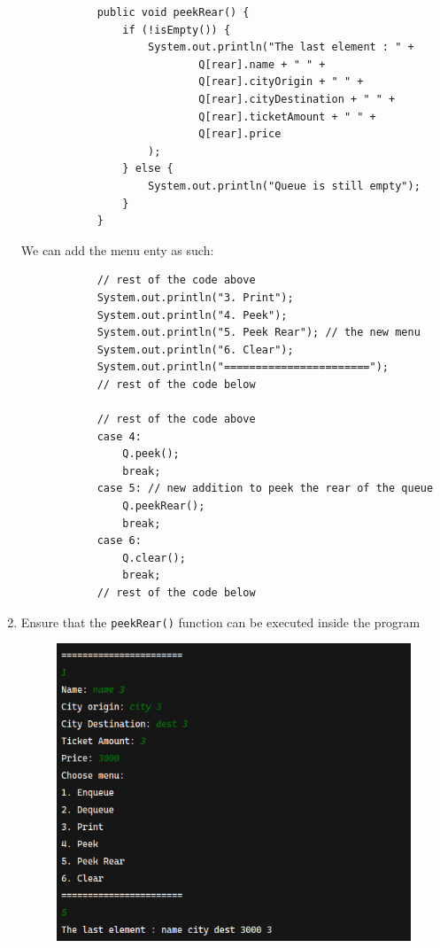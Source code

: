 \documentclass[12pt,titlepage]{article}
\begin{document}
\begin{enumerate}
{        \begin{verbatim}
            public void peekRear() {
                if (!isEmpty()) {
                    System.out.println("The last element : " +
                            Q[rear].name + " " +
                            Q[rear].cityOrigin + " " +
                            Q[rear].cityDestination + " " +
                            Q[rear].ticketAmount + " " +
                            Q[rear].price
                    );
                } else {
                    System.out.println("Queue is still empty");
                }
            }
        \end{verbatim}

        We can add the menu enty as such:
        
        \begin{verbatim}
            // rest of the code above
            System.out.println("3. Print");
            System.out.println("4. Peek");
            System.out.println("5. Peek Rear"); // the new menu
            System.out.println("6. Clear");
            System.out.println("=======================");
            // rest of the code below

            // rest of the code above
            case 4:
                Q.peek();
                break;
            case 5: // new addition to peek the rear of the queue
                Q.peekRear();
                break;
            case 6:
                Q.clear();
                break;
            // rest of the code below
        \end{verbatim}
    }
    \item {
        Ensure that the \texttt{peekRear()} function can be executed inside the program

        \begin{figure}[h]
            \centering
            \includegraphics[width=.8\textwidth]{./images/peek_rear_output.png}
        \end{figure}
    }
\end{enumerate}
\end{document}
